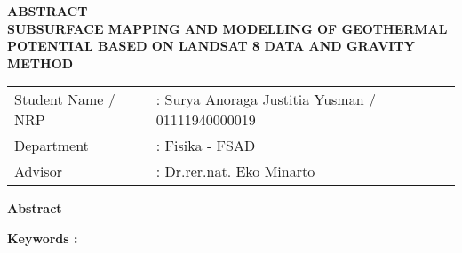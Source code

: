 \newpage
\thispagestyle{empty}

\begin{center}
	\textbf{ABSTRACT}\\
	\vskip 20pt
	\textbf{SUBSURFACE MAPPING AND MODELLING OF GEOTHERMAL POTENTIAL BASED ON LANDSAT 8 DATA AND GRAVITY METHOD}
	\vskip 20pt
\end{center}

\begin{table}[h]
	\begin{tabular}{ll}
		Student Name / NRP &: Surya Anoraga Justitia Yusman / 01111940000019\\
		Department &: Fisika - FSAD\\
		Advisor &: Dr.rer.nat. Eko Minarto
	\end{tabular}
\end{table}

\vskip 10pt
\textbf{Abstract}
\vskip 5pt
\hspace{25pt} 

\vskip 10pt
\textbf{Keywords :} 

\restoregeometry
